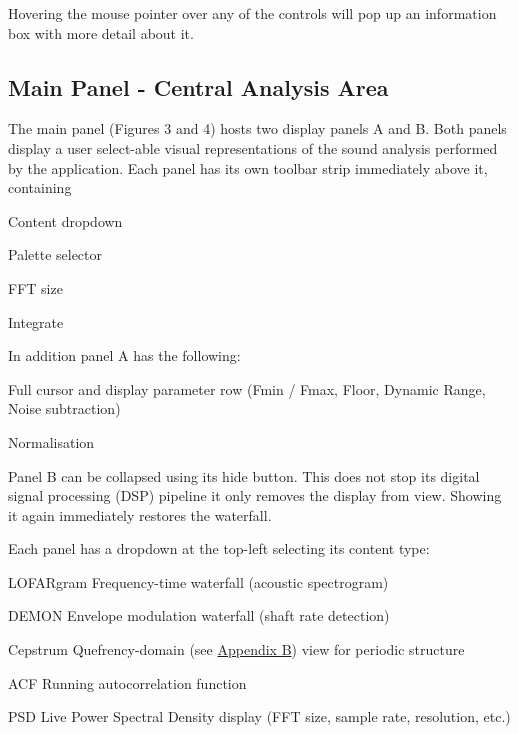 Hovering the mouse pointer over any of the controls will pop up an information box with more detail about it.
\pagebreak
\subsection{Main Panel - Central Analysis Area}

The main panel (Figures 3 and 4) hosts two display panels A and B. Both panels display a user select-able visual representations of the sound analysis performed by the application. Each panel has its own toolbar strip immediately above it, containing

\begin{compactitem}
    \item Content dropdown
    \item Palette selector
    \item FFT size
    \item Integrate
\end{compactitem}

In addition panel A has the following:

\begin{compactitem}
    \item Full cursor and display parameter row (Fmin / Fmax, Floor, Dynamic Range, Noise subtraction)
    \item Normalisation
\end{compactitem}

Panel B can be collapsed using its hide button. This does not stop its digital signal processing (DSP) pipeline it only removes the display from view. Showing it again immediately restores the waterfall.

Each panel has a dropdown at the top-left selecting its content type:

\begin{compactitem}
    \item LOFARgram Frequency-time waterfall (acoustic spectrogram)
    \item DEMON Envelope modulation waterfall (shaft rate detection)
    \item Cepstrum Quefrency-domain (see \hyperref[sec:Appendix_B]{Appendix B}) view for periodic structure
    \item ACF Running autocorrelation function
    \item PSD Live Power Spectral Density display (FFT size, sample rate, resolution, etc.)
\end{compactitem}

